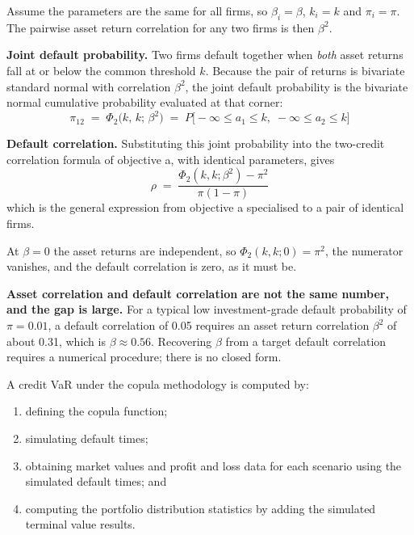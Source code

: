 \begin{crgapbox}
Assume the parameters are the same for all firms, so $\beta_i = \beta$, $k_i = k$
and $\pi_i = \pi$. The pairwise asset return correlation for any two firms is
then $\beta^{2}$.

\smallskip
\textbf{Joint default probability.} Two firms default together when \emph{both}
asset returns fall at or below the common threshold $k$. Because the pair of
returns is bivariate standard normal with correlation $\beta^{2}$, the joint
default probability is the bivariate normal cumulative probability evaluated at
that corner:
\[ \pi_{12} \;=\; \Phi_2\bigl(k,\,k;\,\beta^{2}\bigr)
   \;=\; P\bigl[-\infty \leq a_1 \leq k,\; -\infty \leq a_2 \leq k\bigr] \]

\textbf{Default correlation.} Substituting this joint probability into the
two-credit correlation formula of objective a, with identical parameters, gives
\[ \rho \;=\; \frac{\Phi_2(k,k;\beta^{2}) - \pi^{2}}{\pi(1-\pi)} \]
which is the general expression from objective a specialised to a pair of
identical firms.
\end{crgapbox}

\begin{crkeybox}
At $\beta = 0$ the asset returns are independent, so
$\Phi_2(k,k;0) = \pi^{2}$, the numerator vanishes, and the default correlation is
zero, as it must be.

\smallskip
\textbf{Asset correlation and default correlation are not the same number, and the
gap is large.} For a typical low investment-grade default probability of
$\pi = 0.01$, a default correlation of 0.05 requires an asset return correlation
$\beta^{2}$ of about 0.31, which is $\beta \approx 0.56$. Recovering $\beta$ from
a target default correlation requires a numerical procedure; there is no closed
form.
\end{crkeybox}


A credit VaR under the copula methodology is computed by:

\begin{enumerate}
\item defining the copula function;
\item simulating default times;
\item obtaining market values and profit and loss data for each scenario using
the simulated default times; and
\item computing the portfolio distribution statistics by adding the simulated
terminal value results.
\end{enumerate}


